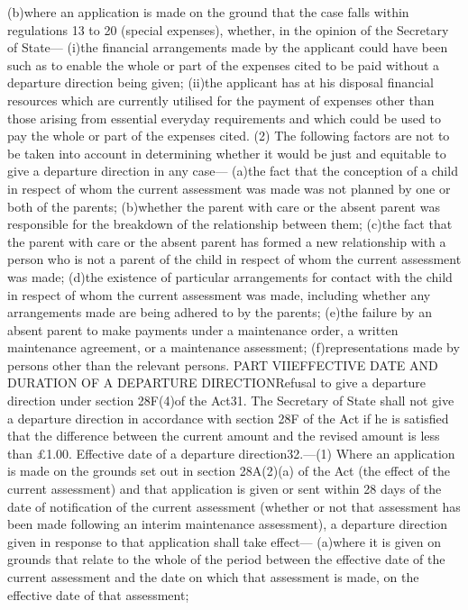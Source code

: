 \documentclass[a4paper]{article}
\begin{document}
(b)where an application is made on the ground that the case falls within
regulations 13 to 20 (special expenses), whether, in the opinion of the
Secretary of State—
(i)the financial arrangements made by the applicant could have been such as to
enable the whole or part of the expenses cited to be paid without a departure
direction being given;
(ii)the applicant has at his disposal financial resources which are currently
utilised for the payment of expenses other than those arising from essential
everyday requirements and which could be used to pay the whole or part of the
expenses cited.
(2) The following factors are not to be taken into account in determining
whether it would be just and equitable to give a departure direction in any
case—
(a)the fact that the conception of a child in respect of whom the current
assessment was made was not planned by one or both of the parents;
(b)whether the parent with care or the absent parent was responsible for the
breakdown of the relationship between them;
(c)the fact that the parent with care or the absent parent has formed a new
relationship with a person who is not a parent of the child in respect of whom
the current assessment was made;
(d)the existence of particular arrangements for contact with the child in
respect of whom the current assessment was made, including whether any
arrangements made are being adhered to by the parents;
(e)the failure by an absent parent to make payments under a maintenance order, a
written maintenance agreement, or a maintenance assessment;
(f)representations made by persons other than the relevant persons.
PART VIIEFFECTIVE DATE AND DURATION OF A DEPARTURE DIRECTIONRefusal to give a
departure direction under section 28F(4)of the Act31. The Secretary of State
shall not give a departure direction in accordance with section 28F of the Act
if he is satisfied that the difference between the current amount and the
revised amount is less than £1.00.
Effective date of a departure direction32.—(1) Where an application is made on
the grounds set out in section 28A(2)(a) of the Act (the effect of the current
assessment) and that application is given or sent within 28 days of the date of
notification of the current assessment (whether or not that assessment has been
made following an interim maintenance assessment), a departure direction given
in response to that application shall take effect—
(a)where it is given on grounds that relate to the whole of the period between
the effective date of the current assessment and the date on which that
assessment is made, on the effective date of that assessment;
\end{document}

